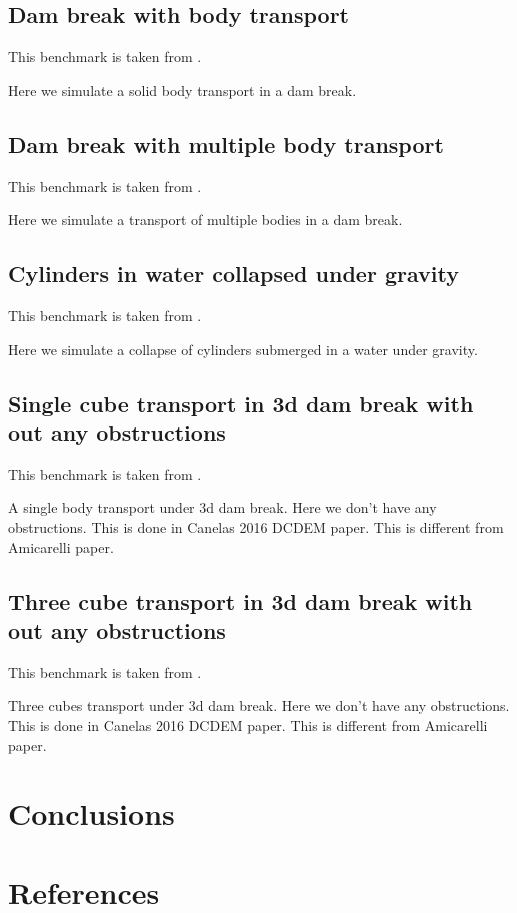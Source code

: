 \documentclass[preprint,12pt]{elsarticle}
\begin{document}
\subsection{Dam break with body transport}
\label{sec:dam-break-with-body-transport}

This benchmark is taken from \citet{wang2019numerical}.

Here we simulate a solid body transport in a dam break.


\subsection{Dam break with multiple body transport}
\label{sec:dam-break-with-multiple-body-transport}

This benchmark is taken from \citet{wang2019numerical}.

Here we simulate a transport of multiple bodies in a dam break.


\subsection{Cylinders in water collapsed under gravity}
\label{sec:cylinders-in-water-collapsed-under-gravity}

This benchmark is taken from \citet{chen2019coupled}.

Here we simulate a collapse of cylinders submerged in a water under gravity.


\subsection{Single cube transport in 3d dam break with out any obstructions}
\label{sec:single-cube-transport-in-3d-dam-break-with-out-any-obstructions}

This benchmark is taken from \citet{ji2019coupled}.

A single body transport under 3d dam break. Here we don't have any
obstructions. This is done in Canelas 2016 DCDEM paper. This is different from
Amicarelli paper.


\subsection{Three cube transport in 3d dam break with out any obstructions}
\label{sec:three-cube-transport-in-3d-dam-break-with-out-any-obstructions}

This benchmark is taken from \citet{ji2019coupled}.

Three cubes transport under 3d dam break. Here we don't have any obstructions.
This is done in Canelas 2016 DCDEM paper. This is different from Amicarelli
paper.


\section{Conclusions}
\label{sec:conclusions}


\section*{References}


\end{document}
